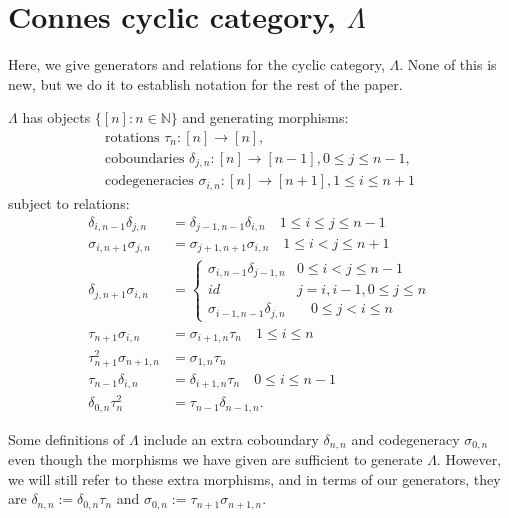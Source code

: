 \chapter{Connes cyclic category, $\Lambda$}\label{chap:lambda}
Here, we give generators and relations for 
the cyclic category, $\Lambda$. None of this 
is new, but we do it to establish notation 
for the rest of the paper.

$\Lambda$ has objects $\{[n]: n \in \mathbb{N}\}$ 
and generating morphisms:
\begin{equation} \label{eqn:cyclic_generators}
\begin{split}
\textrm{rotations } \tau_n:[n] \to [n], \\ 
\textrm{coboundaries } \delta_{j,n}: [n] \to [n-1], 0 \leq j \leq n-1, \\ 
\textrm{codegeneracies } \sigma_{i,n}:[n] \to [n+1], 1 \leq i \leq n+1
\end{split}
\end{equation}
subject to relations:
\begin{equation}\label{eqn:cyclic_relations}
\begin{split}
\delta_{i,n-1} \delta_{j,n} &= \delta_{j-1,n-1} \delta_{i,n} 
  \quad 1 \leq i \leq j \leq n-1 \\
\sigma_{i,n+1} \sigma_{j,n} &= \sigma_{j+1,n+1} \sigma_{i,n}
  \quad 1 \leq i < j \leq n+1 \\
\delta_{j,n+1}\sigma_{i,n} &= 
  \begin{cases}
    \sigma_{i,n-1}\delta_{j-1,n} 
      & 0 \leq i < j \leq n-1\\
    id & j = i, i-1, 0 \leq j \leq n\\
    \sigma_{i-1,n-1}\delta_{j,n} 
      & \quad 0 \leq j < i \leq n
   \end{cases}\\
\tau_{n+1}\sigma_{i,n} &= \sigma_{i+1,n}\tau_n
  \quad 1 \leq i \leq n\\
\tau_{n+1}^2 \sigma_{n+1,n} &= \sigma_{1,n} \tau_n \\
\tau_{n-1}\delta_{i,n} &= \delta_{i+1,n}\tau_n
  \quad 0 \leq i \leq n-1\\
\delta_{0,n}\tau_n^2 &= \tau_{n-1}\delta_{n-1,n}. 
\end{split}
\end{equation}

Some definitions of $\Lambda$ include an extra 
coboundary $\delta_{n,n}$ and codegeneracy 
$\sigma_{0,n}$ even though the morphisms we have given 
are sufficient to generate $\Lambda$. However, 
we will still refer to these extra 
morphisms, and in terms of our generators, they are 
$\delta_{n,n} := \delta_{0,n}\tau_n$ and 
$\sigma_{0,n} := \tau_{n+1} \sigma_{n+1,n}$.